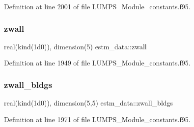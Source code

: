 Definition at line 2001 of file L\+U\+M\+P\+S\+\_\+\+Module\+\_\+constants.\+f95.

\mbox{\label{namespaceestm__data_add3c8dfcc5a6e9e0a8aa1f9a6d88a50c}} 
\subsubsection{\texorpdfstring{zwall}{zwall}}
{\footnotesize\ttfamily real(kind(1d0)), dimension(5) estm\+\_\+data\+::zwall}



Definition at line 1949 of file L\+U\+M\+P\+S\+\_\+\+Module\+\_\+constants.\+f95.

\mbox{\label{namespaceestm__data_a8d30efb7069d9f6ffbca3a762b2ec9ef}} 
\subsubsection{\texorpdfstring{zwall\+\_\+bldgs}{zwall\_bldgs}}
{\footnotesize\ttfamily real(kind(1d0)), dimension(5,5) estm\+\_\+data\+::zwall\+\_\+bldgs}



Definition at line 1971 of file L\+U\+M\+P\+S\+\_\+\+Module\+\_\+constants.\+f95.

